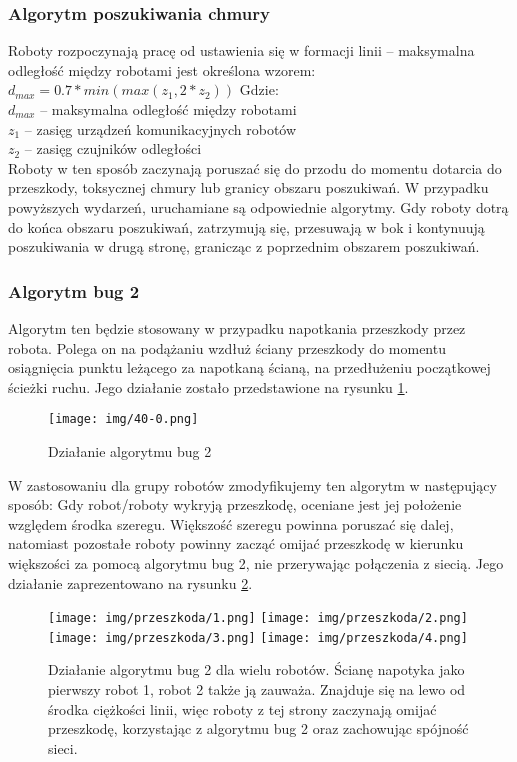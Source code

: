 \documentclass[a4paper, 12pt]{article}
\begin{document}
	\subsubsection{Algorytm poszukiwania chmury}
	Roboty rozpoczynają pracę od ustawienia się w formacji linii -- maksymalna odległość między robotami jest określona wzorem:
	\begin{math}
	d_{max} = 0.7*min(max(z_1,2*z_2))
	\end{math}
	Gdzie:\\
	$d_{max}$ -- maksymalna odległość między robotami\\
	$z_1$ -- zasięg urządzeń komunikacyjnych robotów\\
	$z_2$ -- zasięg czujników odległości\\
	Roboty w ten sposób zaczynają poruszać się do przodu do momentu dotarcia do przeszkody, toksycznej chmury lub granicy obszaru poszukiwań. W przypadku powyższych wydarzeń, uruchamiane są odpowiednie algorytmy.
	Gdy roboty dotrą do końca obszaru poszukiwań, zatrzymują się, przesuwają w bok i kontynuują poszukiwania w drugą stronę, granicząc z poprzednim obszarem poszukiwań.
	\subsubsection{Algorytm bug 2}
	Algorytm ten będzie stosowany w przypadku napotkania przeszkody przez robota. Polega on na podążaniu wzdłuż ściany przeszkody do momentu osiągnięcia punktu leżącego za napotkaną ścianą, na przedłużeniu początkowej ścieżki ruchu. Jego działanie zostało przedstawione na rysunku \ref{bug2_img}.
	\begin{figure}[h!]
		\centering
		\texttt{[image: img/40-0.png]}
		\caption{Działanie algorytmu bug 2}
		\label{bug2_img}
	\end{figure}
	W zastosowaniu dla grupy robotów zmodyfikujemy ten algorytm w następujący sposób:
	Gdy robot/roboty wykryją przeszkodę, oceniane jest jej położenie względem środka szeregu. Większość szeregu powinna poruszać się dalej, natomiast pozostałe roboty powinny zacząć omijać przeszkodę w kierunku większości za pomocą algorytmu bug 2, nie przerywając połączenia z siecią. Jego działanie zaprezentowano na rysunku \ref{omijanie}.
	\begin{figure}[h!]
		\texttt{[image: img/przeszkoda/1.png]}
		\texttt{[image: img/przeszkoda/2.png]}
		\texttt{[image: img/przeszkoda/3.png]}
		\texttt{[image: img/przeszkoda/4.png]}
		\caption{Działanie algorytmu bug 2 dla wielu robotów. Ścianę napotyka jako pierwszy robot 1, robot 2 także ją zauważa. Znajduje się na lewo od środka ciężkości linii, więc roboty z tej strony zaczynają omijać przeszkodę, korzystając z algorytmu bug 2 oraz zachowując spójność sieci.}
		\label{omijanie}
	\end{figure}
	\clearpage
\end{document}
